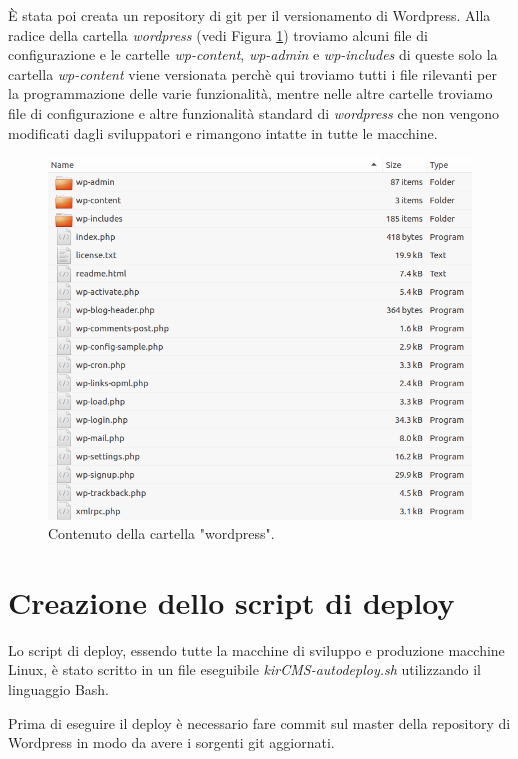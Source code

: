 È stata poi creata un repository di git per il versionamento di Wordpress. 
Alla radice della cartella \emph{wordpress} (vedi Figura \ref{fig:wptree}) troviamo alcuni file di configurazione e le cartelle \emph{wp-content}, \emph{wp-admin} e \emph{wp-includes}\cite{WPDIR} di queste solo la
cartella \emph{wp-content} viene versionata perchè qui troviamo tutti i file rilevanti per la programmazione delle varie funzionalità, mentre nelle
altre cartelle troviamo file di configurazione e altre funzionalità standard di \emph{wordpress} che non vengono modificati dagli sviluppatori
e rimangono intatte in tutte le macchine.

\begin{figure}
  \includegraphics[width=\textwidth]{figure/wpfolder.png}
  \caption{Contenuto della cartella "wordpress".}
  \label{fig:wptree}
\end{figure}

\section{Creazione dello script di deploy}
Lo script di deploy, essendo tutte la macchine di sviluppo e produzione macchine Linux, è stato scritto in un file eseguibile
\emph{kirCMS-autodeploy.sh} utilizzando il linguaggio Bash.

Prima di eseguire il deploy è necessario fare commit sul master della repository di Wordpress in modo da avere i sorgenti git aggiornati.

